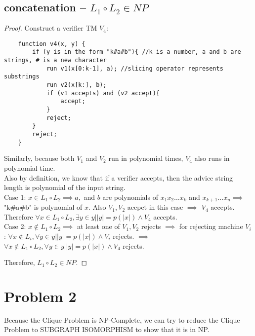 \documentclass[letterpaper]{article}
\begin{document}
\subsection*{concatenation -- $L_1 \circ L_2 \in NP$}
\begin{proof}
    Construct a verifier TM $V_4$:
    \begin{verbatim}
    function v4(x, y) {
        if (y is in the form "k#a#b"){ //k is a number, a and b are strings, # is a new character
            run v1(x[0:k-1], a); //slicing operator represents substrings
            run v2(x[k:], b);
            if (v1 accepts) and (v2 accept){
                accept;
            }
            reject;
        }
        reject;
    }
\end{verbatim}

    Similarly, because both $V_1$ and $V_2$ run in polynomial times, $V_4$ also runs in polynomial time.\\

    Also by definition, we know that if a verifier accepts, then the advice string length is polynomial of the input string.\\

    Case 1: $x\in L_1 \circ L_2 \implies a,$ and $b$ are polynomials of $x_1x_2\dots x_k$ and $x_{k+1}\dots x_n \implies$ "k\#a\#b" is polynomial of $x$.
    Also $V_1, V_2$ accpet in this case $\implies$ $V_4$ accepts. Therefore $\forall x \in L_1 \circ L_2, \exists y \in {y||y|=p(|x|)} \land V_4$ accepts.\\
    Case 2: $x\notin L_1 \circ L_2 \implies $ at least one of $V_1, V_2$ rejects $\implies$ for rejecting machine $V_i$: $\forall x\notin L_i, \forall y \in {y||y|=p(|x|)} \land V_i$ rejects.
    $\implies$ $\forall x\notin L_1 \circ L_2, \forall y \in {y||y|=p(|x|)} \land V_4$ rejects.

    Therefore, $L_1 \circ L_2 \in NP$.
\end{proof}

\section*{Problem 2}
Because the Clique Problem is NP-Complete, we can try to reduce the Clique Problem to SUBGRAPH ISOMORPHISM to show that it is in NP.\\
\end{document}
